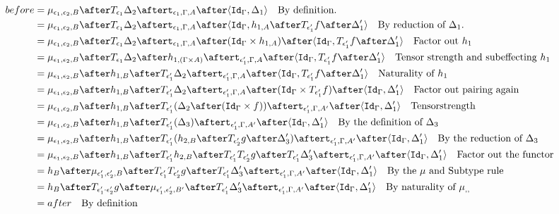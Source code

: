 \documentclass{report}
\begin{document}
            \begin{align*}
                before &= \bind{\e_1}{\e_2}{B}\after \T{\e_1}{\D_2}\after\tstrength{\e_1}{\G}{A}\after\pr{\idg}{\D_1}\qt{By definition.}\\
                &= \bind{\e_1}{\e_2}{B}\after \T{\e_1}{\D_2}\after\tstrength{\e_1}{\G}{A}\after\pr{\idg}{h_{1, A}\after\T{\e_1'}{f}\after\D_1'}\qt{By reduction of $\D_1$.}\\
                &= \bind{\e_1}{\e_2}{B}\after \T{\e_1}{\D_2}\after\tstrength{\e_1}{\G}{A}\after(\idg\times h_{1, A})\after\pr{\idg}{\T{\e_1'}{f}\after\D_1'}\qt{Factor out $h_1$}\\
                &= \bind{\e_1}{\e_2}{B}\after \T{\e_1}{\D_2}\after
                h_{1, (\G\times A)}\after
                \tstrength{\e_1'}{\G}{A}\after\pr{\idg}{\T{\e_1'}{f}\after\D_1'}\qt{Tensor strength and subeffecting $h_1$}\\
                &= \bind{\e_1}{\e_2}{B}\after 
                h_{1, B}\after\T{\e_1'}{\D_2}\after
                \tstrength{\e_1'}{\G}{A}\after\pr{\idg}{\T{\e_1'}{f}\after\D_1'}\qt{Naturality of $h_1$}\\
                &= \bind{\e_1}{\e_2}{B}\after 
                h_{1, B}\after\T{\e_1'}{\D_2}\after
                \tstrength{\e_1'}{\G}{A}\after(\idg\times \T{\e_1'}{f})\after\pr{\idg}{\D_1'}\qt{Factor out pairing again}\\
                &= \bind{\e_1}{\e_2}{B}\after 
                h_{1, B}\after\T{\e_1'}{(\D_2\after(\idg\times f))}\after
                \tstrength{\e_1'}{\G}{A'}\after\pr{\idg}{\D_1'}\qt{Tensorstrength}\\
                &= \bind{\e_1}{\e_2}{B}\after 
                h_{1, B}\after\T{\e_1'}{(\D_3)}\after
                \tstrength{\e_1'}{\G}{A'}\after\pr{\idg}{\D_1'}\qt{By the definition of $\D_3$}\\
                &= \bind{\e_1}{\e_2}{B}\after 
                h_{1, B}\after\T{\e_1'}{(h_{2, B}\after\T{\e_2'}{g}\after \D_3')}\after
                \tstrength{\e_1'}{\G}{A'}\after\pr{\idg}{\D_1'}\qt{By the reduction of $\D_3$}\\
                &= \bind{\e_1}{\e_2}{B}\after 
                h_{1, B}\after\T{\e_1'}{h_{2, B}}\after\T{\e_1'}{\T{\e_2'}{g}}\after \T{\e_1'}{\D_3'}\after
                \tstrength{\e_1'}{\G}{A'}\after\pr{\idg}{\D_1'}\qt{Factor out the functor}\\
                &= h_B\after\bind{\e_1'}{\e_2'}{B}\after\T{\e_1'}{\T{\e_2'}{g}}\after \T{\e_1'}{\D_3'}\after
                \tstrength{\e_1'}{\G}{A'}\after\pr{\idg}{\D_1'}\qt{By the $\mu$ and Subtype rule }\\
                & = h_B\after\T{\e_1'\dot\e_2'}{g}\after\bind{\e_1'}{\e_2'}{B'}\after \T{\e_1'}{\D_3'}\after
                \tstrength{\e_1'}{\G}{A'}\after\pr{\idg}{\D_1'}\qt{By naturality of $\bind{}{}{}$ }\\
                & = after \qt{By definition}
            \end{align*}
\end{document}
